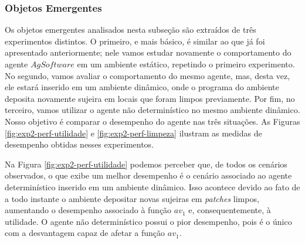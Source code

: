 \subsubsection{Objetos Emergentes}

Os objetos emergentes analisados nesta subseção são extraídos de três experimentos distintos. O primeiro, e mais básico, é similar ao que já foi apresentado anteriormente; nele vamos estudar novamente o comportamento do agente $AgSoftware$ em um ambiente estático, repetindo o primeiro experimento. No segundo, vamos avaliar o comportamento do mesmo agente, mas, desta vez, ele estará inserido em um ambiente dinâmico, onde o programa do ambiente deposita novamente sujeira em locais que foram limpos previamente. Por fim, no terceiro, vamos utilizar o agente não determinístico no mesmo ambiente dinâmico. Nosso objetivo é comparar o desempenho do agente nas três situações. As Figuras \ref{fig:exp2-perf-utilidade} e \ref{fig:exp2-perf-limpeza} ilustram as medidas de desempenho obtidas nesses experimentos.

\begin{figure}[h!]
    \centering
\end{figure}

Na Figura \ref{fig:exp2-perf-utilidade} podemos perceber que, de todos os cenários observados, o que exibe um melhor desempenho é o cenário associado ao agente determinístico inserido em um ambiente dinâmico. Isso acontece devido ao fato de a todo instante o ambiente depositar novas sujeiras em \textit{patches} limpos, aumentando o desempenho associado à função $av_1$ e, consequentemente, à utilidade. O agente não determinístico possui o pior desempenho, pois é o único com a desvantagem capaz de afetar a função $av_1$. 

